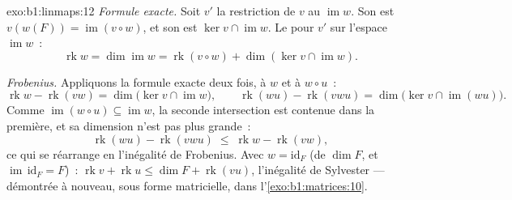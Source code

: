 \begin{solution}{exo:b1:linmaps:12}
\emph{Formule exacte.} Soit $v'$ la restriction de $v$ au
 $\operatorname{im} w$. Son  est $v(w(F)) =
\operatorname{im}(v \circ w)$, et son  est $\ker v \cap
\operatorname{im} w$. Le  pour $v'$ sur l'espace
$\operatorname{im} w$~:
\[
\operatorname{rk} w = \dim\operatorname{im} w
= \operatorname{rk}(v \circ w) + \dim(\ker v \cap
\operatorname{im} w) .
\]

\emph{Frobenius.} Appliquons la formule exacte deux fois, à $w$ et à
$w \circ u$~:
\[
\operatorname{rk} w - \operatorname{rk}(vw)
= \dim\bigl(\ker v \cap \operatorname{im} w\bigr),
\qquad
\operatorname{rk}(wu) - \operatorname{rk}(vwu)
= \dim\bigl(\ker v \cap \operatorname{im}(wu)\bigr) .
\]
Comme $\operatorname{im}(w \circ u) \subseteq \operatorname{im}
w$, la seconde intersection est contenue dans la première, et sa
dimension n'est pas plus grande~:
\[
\operatorname{rk}(wu) - \operatorname{rk}(vwu)
\;\leq\; \operatorname{rk} w - \operatorname{rk}(vw) ,
\]
ce qui se réarrange en l'inégalité de Frobenius. Avec $w =
\mathrm{id}_F$ (de  $\dim F$, et $\operatorname{im}\,
\mathrm{id}_F = F$)~: $\operatorname{rk} v + \operatorname{rk} u
\leq \dim F + \operatorname{rk}(vu)$, l'inégalité de Sylvester ---
démontrée à nouveau, sous forme matricielle, dans l'\cref{exo:b1:matrices:10}.
\end{solution}

